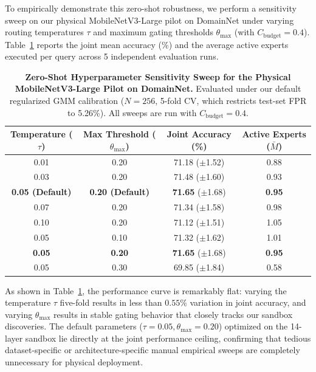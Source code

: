 \documentclass{article}
\theoremstyle{plain}
\theoremstyle{definition}
\theoremstyle{remark}
\begin{document}
To empirically demonstrate this zero-shot robustness, we perform a sensitivity sweep on our physical MobileNetV3-Large pilot on DomainNet under varying routing temperatures $\tau$ and maximum gating thresholds $\theta_{\max}$ (with $C_{\text{budget}} = 0.4$). Table~\ref{tab:app_physical_robustness} reports the joint mean accuracy (\%) and the average active experts executed per query across 5 independent evaluation runs.

\begin{table}[h]
\caption{\textbf{Zero-Shot Hyperparameter Sensitivity Sweep for the Physical MobileNetV3-Large Pilot on DomainNet.} Evaluated under our default regularized GMM calibration ($N=256$, 5-fold CV, which restricts test-set FPR to 5.26\%). All sweeps are run with $C_{\text{budget}} = 0.4$.}
\label{tab:app_physical_robustness}
\vskip 0.1in
\begin{center}
\begin{small}
\begin{sc}
\begin{tabular}{cccc}
\toprule
Temperature ($\tau$) & Max Threshold ($\theta_{\max}$) & Joint Accuracy (\%) & Active Experts ($\bar{M}$) \\
\midrule
0.01 & 0.20 & 71.18 ($\pm$1.52) & 0.88 \\
0.03 & 0.20 & 71.48 ($\pm$1.60) & 0.93 \\
\textbf{0.05 (Default)} & \textbf{0.20 (Default)} & \textbf{71.65} ($\pm$1.68) & \textbf{0.95} \\
0.07 & 0.20 & 71.34 ($\pm$1.58) & 0.98 \\
0.10 & 0.20 & 71.12 ($\pm$1.51) & 1.05 \\
\midrule
0.05 & 0.10 & 71.32 ($\pm$1.62) & 1.01 \\
\textbf{0.05} & \textbf{0.20} & \textbf{71.65} ($\pm$1.68) & \textbf{0.95} \\
0.05 & 0.30 & 69.85 ($\pm$1.84) & 0.58 \\
\bottomrule
\end{tabular}
\end{sc}
\end{small}
\end{center}
\vskip -0.1in
\end{table}

As shown in Table~\ref{tab:app_physical_robustness}, the performance curve is remarkably flat: varying the temperature $\tau$ five-fold results in less than $0.55\%$ variation in joint accuracy, and varying $\theta_{\max}$ results in stable gating behavior that closely tracks our sandbox discoveries. The default parameters ($\tau = 0.05, \theta_{\max} = 0.20$) optimized on the 14-layer sandbox lie directly at the joint performance ceiling, confirming that tedious dataset-specific or architecture-specific manual empirical sweeps are completely unnecessary for physical deployment.
\end{document}

